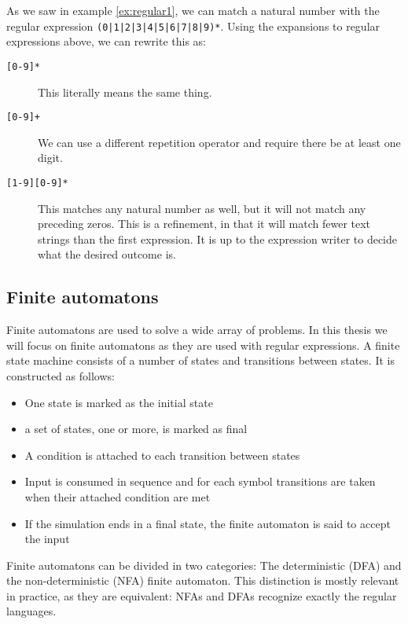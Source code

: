 \begin{example}

As we saw in example \ref{ex:regular1}, we can match a natural number
with the regular expression \texttt{(0|1|2|3|4|5|6|7|8|9)*}. Using the
expansions to regular expressions above, we can rewrite this as:
\begin{description}
\item[\texttt{[0-9]*}] This literally means the same thing.
\item[\texttt{[0-9]+}] We can use a different repetition operator and
  require there be at least one digit.
\item[\texttt{[1-9][0-9]*}] This matches any natural number as
  well, but it will not match any preceding zeros. This is a
  refinement, in that it will match fewer text strings than the first
  expression. It is up to the expression writer to decide what the desired outcome is.
\end{description}
\end{example}


\subsection{Finite automatons}

Finite automatons are used to solve a wide array of problems. In this
thesis we will focus on finite automatons as they are used with
regular expressions. 
A finite state machine consists of a number of
states and transitions between states. It is constructed as follows:
\begin{itemize}
    \item One state is marked as the
    initial state
    \item a set of states, one or more, is marked as final
    \item A condition is attached to each transition between states
    \item Input is consumed in sequence and for each symbol transitions are taken when their attached condition are met
    \item If the simulation ends in a final state, the finite automaton is said to accept the input
\end{itemize}

Finite automatons can be divided in two categories: The deterministic
(DFA) and the non-deterministic (NFA) finite automaton. This
distinction is mostly relevant in practice, as they are
equivalent: NFAs and DFAs recognize exactly the regular languages.

